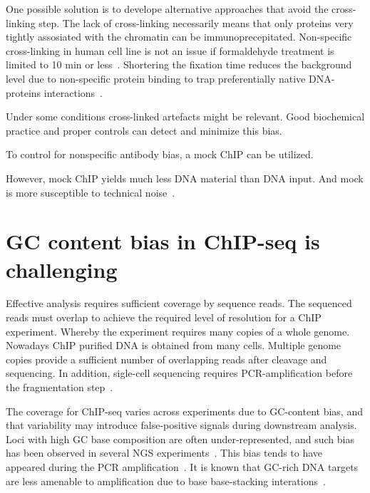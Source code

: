 One possible solution is to develope alternative approaches that avoid the cross-linking step.
The lack of cross-linking necessarily means that only proteins very tightly assosiated with the chromatin can be immunoprecepitated.
Non-specific cross-linking in human cell line is not an issue if formaldehyde treatment is limited to 10 min or less~\cite{}.
Shortering the fixation time reduces the background level due to non-specific protein binding to trap preferentially native DNA-proteins interactions~\cite{baranello2016chip}.

Under some conditions cross-linked artefacts might be relevant.
Good biochemical practice and proper controls can detect and minimize this bias.

To control for nonspecific antibody bias, a mock ChIP can be utilized.

However, mock ChIP yields much less DNA material than DNA input.
And mock is more susceptible to technical noise~\cite{kidder2011chip, landt2012chip}.


\section{GC content bias in ChIP-seq is challenging}
Effective analysis requires sufficient coverage by sequence reads. 
The sequenced reads must overlap to achieve the required level of resolution for a ChIP experiment.
Whereby the experiment requires many copies of a whole genome.
Nowadays ChIP purified DNA is obtained from many cells.
Multiple genome copies provide a sufficient number of overlapping reads after cleavage and sequencing.
In addition, sigle-cell sequencing requires PCR-amplification before the fragmentation step~\cite{clark2016single}.


The coverage for ChIP-seq varies across experiments due to GC-content bias, and that variability may introduce false-positive signals during downstream analysis.
Loci with high GC base composition are often under-represented, and such bias has been observed in several NGS experiments~\cite{benjamini2012summarizing}\cite{dohm2008substantial}\cite{teng2017accounting}.
This bias tends to have appeared during the PCR amplification~\cite{ross2013characterizing}.
It is known that GC-rich DNA targets are less amenable to amplification due to base base-stacking interations~\cite{yakovchuk2006base}.

